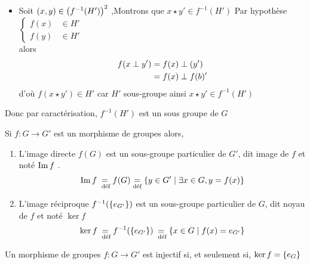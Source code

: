 \begin{dem}
\begin{itemize}
\begin{itemize}
            \item Soit \(\left(x,y\right) \in \left(f^{-1}(H')\right)^2\) ,Montrons que \(x \star y' \in f^{-1}(H')\) 
            Par hypothèse \(\begin{cases}
                f(x) &\in H' \\
                f(y)& \in H'
            \end{cases}\)\\
            alors \begin{align*}
                f(x \perp y') &= f(x) \perp \left(y'\right) \\
                &= f(x) \perp f(b)'\\
            \end{align*}
            d'où \(f(x \star y') \in H' \) car \(H'\) sous-groupe ainsi \(x \star y' \in f^{-1}(H')\)
        \end{itemize}
        Donc par caractérisation, \(f^{-1}(H')\) est un sous groupe de \(G\)
    \end{itemize}
\end{dem}
\begin{defprop}
    Si \(f : G \to G'\) est un morphisme de groupes alors,
    \begin{enumerate}
        \item L’image directe \(f (G)\) est un sous-groupe particulier de \(G'\), dit image de \(f\) et noté \(\operatorname{Im} f\) .
    \[\operatorname{Im} f  \underset{\text{ déf}}{=} f(G) \underset{\text{déf}}{=} \left\lbrace y \in G' \;\middle|\; \exists x \in G, y = f (x)\right\rbrace \]
        \item L’image réciproque \(f ^{-1} (\left\lbrace e_{G'}\right\rbrace)\) est un sous-groupe particulier de \(G\), dit noyau de \(f\) et noté \(\ker f\)
    \[\ker f   \underset{\text{ déf}}{=} f ^{-1} (\left\lbrace e_{G' }\right\rbrace) \underset{\text{ déf}}{=} \left\lbrace x \in G \;\middle|\; f (x) = e_{G'}\right\rbrace \]
    \end{enumerate}
\end{defprop}

\begin{defprop}
    Un morphisme de groupes \(f : G \to G'\) est injectif si, et seulement si, \(\ker f = \left\lbrace e_G\right\rbrace\)
\end{defprop}

